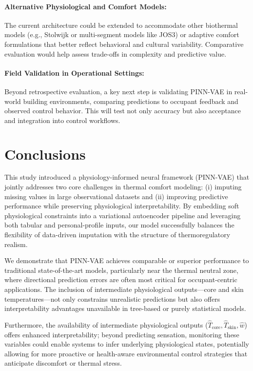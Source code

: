 \paragraph{Alternative Physiological and Comfort Models:} The current architecture could be extended to accommodate other biothermal models (e.g., Stolwijk\cite{Stolwijk1971} or multi-segment models like JOS3\cite{Takahashi2002JOS}) or adaptive comfort formulations that better reflect behavioral and cultural variability. Comparative evaluation would help assess trade-offs in complexity and predictive value.

\paragraph{Field Validation in Operational Settings:} Beyond retrospective evaluation, a key next step is validating PINN-VAE in real-world building environments, comparing predictions to occupant feedback and observed control behavior. This will test not only accuracy but also acceptance and integration into control workflows.

\section{Conclusions}
This study introduced a physiology-informed neural framework (PINN-VAE) that jointly addresses two core challenges in thermal comfort modeling: (i) imputing missing values in large observational datasets and (ii) improving predictive performance while preserving physiological interpretability. By embedding soft physiological constraints into a variational autoencoder pipeline and leveraging both tabular and personal-profile inputs, our model successfully balances the flexibility of data-driven imputation with the structure of thermoregulatory realism.

We demonstrate that PINN-VAE achieves comparable or superior performance to traditional state-of-the-art models, particularly near the thermal neutral zone, where directional prediction errors are often most critical for occupant-centric applications. The inclusion of intermediate physiological outputs—core and skin temperatures—not only constrains unrealistic predictions but also offers interpretability advantages unavailable in tree-based or purely statistical models.

Furthermore, the availability of intermediate physiological outputs ($\hat{T}_{\text{core}}, \hat{T}_{\text{skin}}, \hat{w}$) offers enhanced interpretability; beyond predicting sensation, monitoring these variables could enable systems to infer underlying physiological states, potentially allowing for more proactive or health-aware environmental control strategies that anticipate discomfort or thermal stress.

